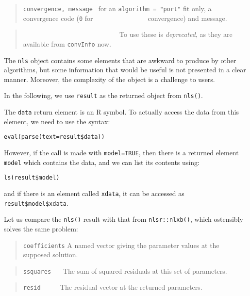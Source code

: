 \begin{quote}
\texttt{convergence,\ message} ~for an \texttt{algorithm\ =\ "port"} fit only, a convergence code (\texttt{0} for \newline
\(~~~~~~~~~~~~~~~~~~~~~~~~~~~~~~~~~~~\)convergence) and message.
\end{quote}

\begin{quote}
~ ~ ~ ~ ~ ~ ~ ~ ~ ~ ~ ~ ~ ~ ~ ~ ~ To use these is \emph{deprecated}, as they are available from \texttt{convInfo} now.
\end{quote}

The \texttt{nls} object contains some elements that are awkward to produce by other
algorithms, but some information that would be useful is not presented in a
clear manner. Moreover, the complexity of the object is a challenge to users.

In the following, we use \texttt{result} as the returned object from \texttt{nls()}.

The \texttt{data} return element is an R symbol. To actually access the data from this
element, we need to use the syntax:

\begin{verbatim}
eval(parse(text=result$data))
\end{verbatim}

However, if the call is made with \texttt{model=TRUE}, then there is a returned element
\texttt{model} which contains the data, and we can list its contents using:

\begin{verbatim}
ls(result$model)
\end{verbatim}

and if there is an element called \texttt{xdata}, it can be accessed as \texttt{result\$model\$xdata}.

Let us compare the \texttt{nls()} result with that from
\texttt{nlsr::nlxb()}, which ostensibly solves the same problem:

\begin{quote}
\texttt{coefficients} A named vector giving the parameter values at the supposed solution.
\end{quote}

\begin{quote}
\texttt{ssquares} \(~~~~~\) The sum of squared residuals at this set of parameters.
\end{quote}

\begin{quote}
\texttt{resid} \(~~~~~~~~~~\) The residual vector at the returned parameters.
\end{quote}


